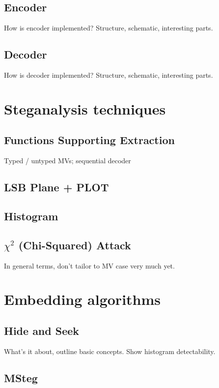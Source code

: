 \documentclass[12pt,british,twoside,notitlepage,usenames,dvipsnames,hypens,final]{report}
\numberwithin{equation}{section}
\numberwithin{figure}{section}
\begin{document}
\subsection{Encoder}

How is encoder implemented? Structure, schematic, interesting parts. 

\subsection{Decoder}

How is decoder implemented? Structure, schematic, interesting parts. 

\section{Steganalysis techniques}

\subsection{Functions Supporting Extraction}

Typed / untyped MVs; sequential decoder

\subsection{LSB Plane + PLOT}

\subsection{Histogram}

\subsection{$\chi^2$ (Chi-Squared) Attack}

In general terms, don't tailor to MV case very much yet.

\section{Embedding algorithms}

\subsection{Hide and Seek}

What's it about, outline basic concepts. Show histogram detectability.

\subsection{MSteg}
\end{document}
